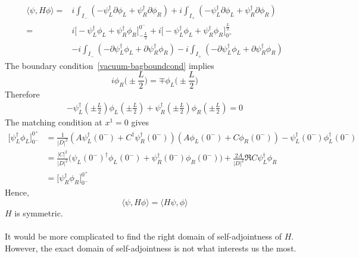\begin{equation}\label{sa-hamiltonian}
\begin{split}
\langle \psi, H \phi \rangle = & i \int_{I_-} ( - \psi_L^\dagger \partial \phi_L + \psi_R^\dagger \partial \phi_R )
+ i \int_{I_+} ( - \psi_L^\dagger \partial \phi_L + \psi_R^\dagger \partial \phi_R ) \\
= & i \big[-\psi_L^\dagger \phi_L + \psi_R^\dagger \phi_R \big]^{0^-}_{-\frac{L}{2}} + i \big[-\psi_L^\dagger \phi_L + \psi_R^\dagger \phi_R \big]_{0^+}^{\frac{L}{2}} \\
& - i \int_{I_-} ( - \partial \psi_L^\dagger \phi_L + \partial \psi_R^\dagger  \phi_R ) - i \int_{I_+} ( - \partial \psi_L^\dagger \phi_L + \partial \psi_R^\dagger  \phi_R ) 
\end{split}
\end{equation}
The boundary condition~\cref{vacuum-bagboundcond} implies
\begin{equation*}
i\phi_R \big(\pm \frac L 2) = \mp\phi_L\big(\pm\frac L 2\big)
\end{equation*}
Therefore
\begin{equation*}
\begin{split}
- \psi_L^\dagger(\pm \frac{L}{2}) \phi_L(\pm \frac{L}{2}) + \psi_R^\dagger(\pm \frac{L}{2}) \phi_R(\pm \frac{L}{2}) = 
0
\end{split}
\end{equation*}
The matching condition at $x^1 = 0$ gives
\begin{equation*}
\begin{split}
\big[ \psi^\dagger_L\phi_L] ^{0^+}_{0^-} & = \frac{1}{|D|^2}(A \psi_L^\dagger(0^-) + C^\dagger\psi^\dagger_R(0^-))(A \phi_L(0^-) + C\phi_R(0^-)) - \psi^\dagger_L(0^-)\phi^\dagger_L(0^-) \\
& = \frac{|C|^2}{|D|^2}\big(\psi_L(0^-)^\dagger\phi_L(0^-) + \psi_R^\dagger(0^-) \phi_R(0^-)\big) +
\frac{2A}{|D|^2}\Re{C\psi_L^\dagger \phi_R} \\
& = \big[ \psi^\dagger_R\phi_R] ^{0^+}_{0^-}
\end{split}
\end{equation*}
Hence, 
\begin{equation*}
\langle \psi, H \phi \rangle = \langle H \psi , \phi \rangle
\end{equation*}
$H$ is symmetric. 
\\\\
It would be more complicated to find the right domain of self-adjointness of $H$.
However, the exact domain of self-adjointness is not what interests us the most. 
